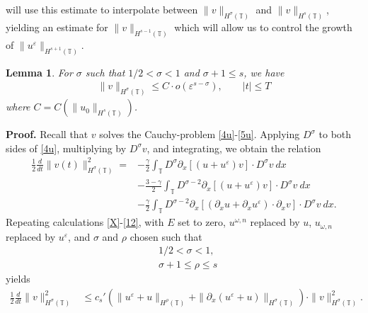 \documentclass[12pt,reqno]{amsart}
\newcommand{\p}{\partial}
\newcommand{\ci}{\mathbb{T}}
\newcommand{\ee}{\varepsilon}
\theoremstyle{plain}  %
\newtheorem{lemma}{Lemma}
\theoremstyle{definition}
\begin{document}
\begin{appendices}
	will use this estimate to interpolate between $\|v\|_{H^\sigma(\ci)}$
	and $\|v\|_{H^s(\ci)}$,
	yielding an estimate for $\|v\|_{H^{s-1}(\ci)}$ which will allow us to control the growth of
	$\|u^\ee\|_{H^{s+1}(\ci)}$. 
\begin{lemma} 
	\label{lem6r}
	For $\sigma$ such that $1/2 < \sigma < 1$ and $\sigma + 1 \le s$, we have
	\begin{equation}
	\begin{split}
		\|v\|_{H^{\sigma}(\ci)} \le C \cdot o(\ee^{s- \sigma }), \qquad |t| \le T
	\end{split}
\end{equation}
where $C=C(\|u_0\|_{H^s(\ci)})$.
\end{lemma}
%
%
%
{\bf Proof.}
Recall that $v$ solves the Cauchy-problem \eqref{4u}-\eqref{5u}.
Applying $D^\sigma$ to both sides of \eqref{4u}, multiplying by
$D^\sigma v$, and integrating, we obtain the
relation
\begin{equation*}
	\begin{split}
		\frac{1}{2}\frac{d}{dt}\|v(t)\|_{H^\sigma(\ci)}^2
		= & - \frac{\gamma}{2}\int_{\ci} D^\sigma
		\p_x \left[ \left( u + u^\ee \right)v
		\right]\cdot D^\sigma v \ dx
		\\
		& - \frac{3-\gamma}{2}\int_{\ci} D^{\sigma
		-2} \p_x \left[ \left( u + u^\ee
		\right)v \right] \cdot D^\sigma v \ dx
		\\
		& - \frac{\gamma}{2}\int_{\ci} D^{\sigma
		-2}
		\p_x \left[ \left( \p_x u + \p_x u^\ee
		\right)\cdot \p_x v \right] \cdot
		D^\sigma v \ dx.
	\end{split}
\end{equation*}
Repeating calculations \eqref{X}-\eqref{12}, with $E$ set to zero,
$u^{\omega,n}$ replaced by $u$, $u_{\omega,n}$ replaced by $u^\ee$, and
$\sigma$ and $\rho$ chosen such that
%
\begin{equation}
	\label{size_of_sigma}
	\begin{split}
	& 1/2 < \sigma < 1,
	\\
	& \sigma + 1 \le \rho \le s 
	\end{split}
\end{equation}
yields
 \begin{equation*}
	\begin{split}
		\frac{1}{2}\frac{d}{dt} \|v\|_{H^\sigma(\ci)}^2
		& \le
		c_s' (\|u^{\ee} + u\|_{H^{\rho}(\ci)} +
		\|\p_x(u^{\ee} + u) \|_{H^\sigma(\ci)})
		\cdot \|v\|_{H^\sigma(\ci)}^2.
	\end{split}
\end{equation*}

\end{appendices}
\end{document}
